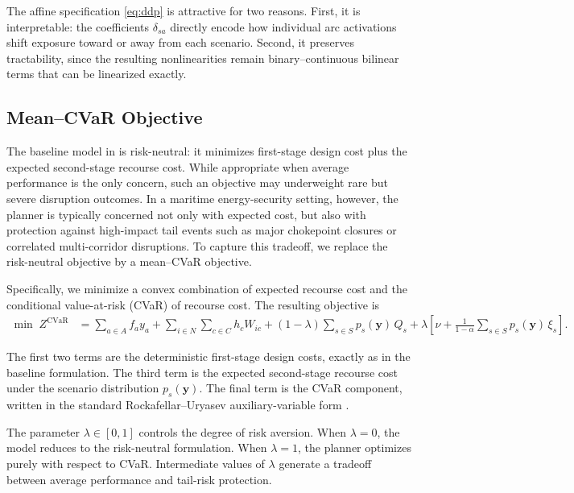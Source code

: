 \documentclass[final,3p,authoryear]{elsarticle}
\theoremstyle{definition}
\begin{document}
The affine specification \eqref{eq:ddp} is attractive for two reasons.
First, it is interpretable: the coefficients $\delta_{sa}$ directly encode
how individual arc activations shift exposure toward or away from each
scenario. Second, it preserves tractability, since the resulting
nonlinearities remain binary--continuous bilinear terms that can be
linearized exactly.


\subsection{Mean--CVaR Objective}
\label{sec:cvar}

The baseline model in  is risk-neutral: it minimizes
first-stage design cost plus the expected second-stage recourse cost.
While appropriate when average performance is the only concern, such an
objective may underweight rare but severe disruption outcomes. In a
maritime energy-security setting, however, the planner is typically
concerned not only with expected cost, but also with protection against
high-impact tail events such as major chokepoint closures or correlated
multi-corridor disruptions. To capture this tradeoff, we replace the
risk-neutral objective by a mean--CVaR objective.

Specifically, we minimize a convex combination of expected recourse cost
and the conditional value-at-risk (CVaR) of recourse cost. The resulting
objective is
\begin{align}
\min \; Z^{\mathrm{CVaR}}
&=
\sum_{a \in A} f_a y_a
+
\sum_{i \in N}\sum_{c \in C} h_c W_{ic}
+
(1-\lambda)\sum_{s \in S} p_s(\mathbf y)\, Q_s
+
\lambda \left[
\nu + \frac{1}{1-\alpha}\sum_{s \in S} p_s(\mathbf y)\,\xi_s
\right].
\label{eq:obj-cvar}
\end{align}

The first two terms are the deterministic first-stage design costs,
exactly as in the baseline formulation. The third term is the expected
second-stage recourse cost under the scenario distribution
$p_s(\mathbf y)$. The final term is the CVaR component, written in the
standard Rockafellar--Uryasev auxiliary-variable form \cite{rockafellar2000}.

The parameter $\lambda \in [0,1]$ controls the degree of risk aversion.
When $\lambda = 0$, the model reduces to the risk-neutral formulation.
When $\lambda = 1$, the planner optimizes purely with respect to CVaR.
Intermediate values of $\lambda$ generate a tradeoff between average
performance and tail-risk protection.
\end{document}
